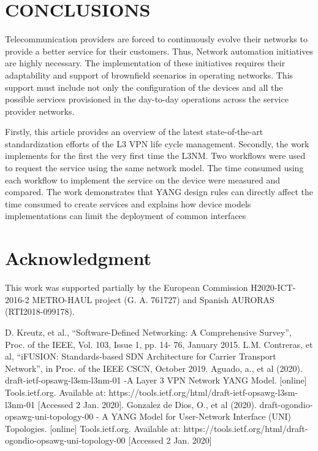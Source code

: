 \documentclass[conference]{IEEEtran}
\begin{document}
\section{CONCLUSIONS}

Telecommunication providers are forced to continuously evolve their networks to provide a better service for their customers. Thus, Network automation initiatives are highly necessary.  The implementation of these initiatives requires their adaptability and support of brownfield scenarios in operating networks. This support must include not only the configuration of the devices and all the possible services provisioned in the day-to-day operations across the service provider networks. 

Firstly, this article provides an overview of the latest state-of-the-art standardization efforts of the L3 VPN life cycle management. Secondly, the work implements for the first the very first time the L3NM. Two workflows were used to request the service using the same network model. The time consumed using each workflow to implement the service on the device were measured and compared. The work demonstrates that YANG design rules can directly affect the time consumed to create services and explains how device models implementations can limit the deployment of common interfaces

\section*{Acknowledgment}
This work was supported partially by the European Commission H2020-ICT-2016-2 METRO-HAUL project (G. A. 761727) and Spanish AURORAS (RTI2018-099178).

\begin{thebibliography}{00}
 D. Kreutz, et al., “Software-Defined Networking: A Comprehensive Survey”, Proc. of the IEEE, Vol. 103, Issue 1, pp. 14- 76, January 2015.
 L.M. Contreras, et al, “iFUSION: Standards-based SDN Architecture for Carrier Transport Network”, in Proc. of the IEEE CSCN, October 2019.
 Aguado, a., et al (2020). draft-ietf-opsawg-l3sm-l3nm-01 -A Layer 3 VPN Network YANG Model. [online] Tools.ietf.org. Available at: https://tools.ietf.org/html/draft-ietf-opsawg-l3sm-l3nm-01 [Accessed 2 Jan. 2020].
 Gonzalez de Dios, O., et al (2020). draft-ogondio-opsawg-uni-topology-00 - A YANG Model for User-Network Interface (UNI) Topologies. [online] Tools.ietf.org. Available at: https://tools.ietf.org/html/draft-ogondio-opsawg-uni-topology-00 [Accessed 2 Jan. 2020]
\end{thebibliography}
\end{document}
